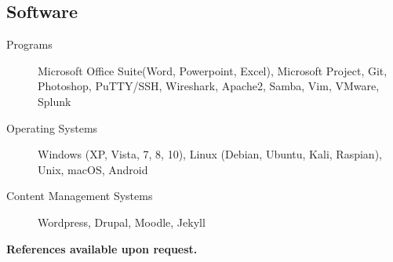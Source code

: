 \documentclass{article}
\begin{document}
\begin{samepage}
\subsection{Software}

\begin{description}
\item[Programs] Microsoft Office Suite(Word, Powerpoint, Excel), Microsoft Project, Git, Photoshop, PuTTY/SSH, Wireshark, Apache2, Samba, Vim, VMware, Splunk
\item[Operating Systems] Windows (XP, Vista, 7, 8, 10), Linux (Debian, Ubuntu, Kali, Raspian), Unix,  macOS, Android 
\item[Content Management Systems] Wordpress, Drupal, Moodle, Jekyll
\end{description}


\begin{center}
\textbf{References available upon request.}
\end{center}

\thispagestyle{empty}
\end{samepage}
\end{document}
